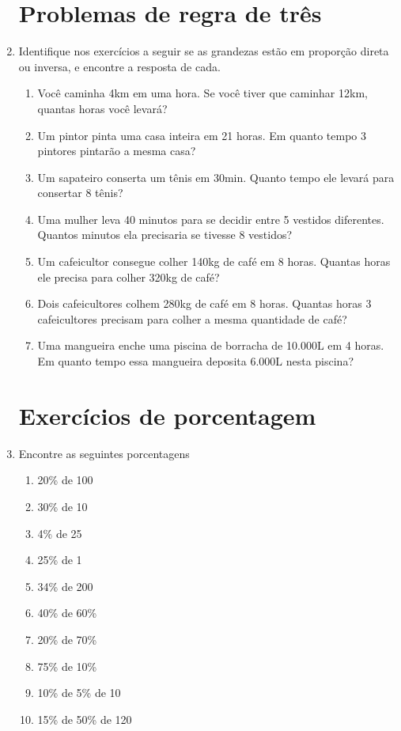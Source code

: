 \documentclass[a4paper]{article}
\begin{document}
\begin{enumerate}
\section*{Problemas de regra de três}

\item Identifique nos exercícios a seguir se as grandezas estão em
  proporção direta ou inversa, e encontre a resposta de cada.

  \begin{enumerate}
  \item Você caminha 4km em uma hora. Se você tiver que caminhar 12km,
    quantas horas você levará?

  \item Um pintor pinta uma casa inteira em 21 horas. Em quanto tempo
    3 pintores pintarão a mesma casa?

  \item Um sapateiro conserta um tênis em 30min. Quanto tempo ele
    levará para consertar 8 tênis?

  \item Uma mulher leva 40 minutos para se decidir entre 5 vestidos
    diferentes. Quantos minutos ela precisaria se tivesse 8 vestidos?

  \item Um cafeicultor consegue colher 140kg de café em 8
    horas. Quantas horas ele precisa para colher 320kg de café?

  \item Dois cafeicultores colhem 280kg de café em 8 horas. Quantas
    horas 3 cafeicultores precisam para colher a mesma quantidade de
    café?

  \item Uma mangueira enche uma piscina de borracha de 10.000L em 4
    horas. Em quanto tempo essa mangueira deposita 6.000L nesta
    piscina?
  \end{enumerate}

\section*{Exercícios de porcentagem}

\item Encontre as seguintes porcentagens

  \begin{enumerate}
  \item 20\% de 100
  \item 30\% de 10
  \item 4\% de 25
  \item 25\% de 1
  \item 34\% de 200
  \item 40\% de 60\%
  \item 20\% de 70\%
  \item 75\% de 10\%
  \item 10\% de 5\% de 10
  \item 15\% de 50\% de 120
  \end{enumerate}

\end{enumerate}
\end{document}
